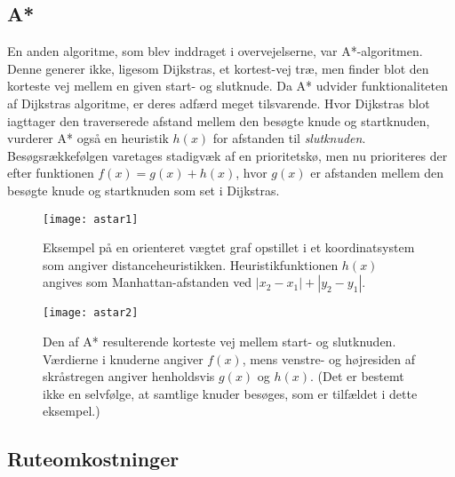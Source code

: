 \subsection{A*}
\label{subsec:astar}
En anden algoritme, som blev inddraget i overvejelserne, var A*-algoritmen. Denne generer ikke, ligesom Dijkstras, et kortest-vej træ, men finder blot den korteste vej mellem en given start- og slutknude. Da A* udvider funktionaliteten af Dijkstras algoritme, er deres adfærd meget tilsvarende. Hvor Dijkstras blot iagttager den traverserede afstand mellem den besøgte knude og startknuden, vurderer A* også en heuristik $h(x)$ for afstanden til \emph{slutknuden}. Besøgsrækkefølgen varetages stadigvæk af en prioritetskø, men nu prioriteres der efter funktionen $f(x)=g(x)+h(x)$, hvor $g(x)$ er afstanden mellem den besøgte knude og startknuden som set i Dijkstras.

\begin{figure}[h]
	\centering
  \texttt{[image: astar1]}
  \captionsetup{width=0.8\textwidth}
	\caption{Eksempel på en orienteret vægtet graf opstillet i et koordinatsystem som angiver distanceheuristikken. Heuristikfunktionen $h(x)$ angives som Manhattan-afstanden ved $|x_2-x_1|+|y_2-y_1|$.}
  \label{fig:astar1}
\end{figure}

\begin{figure}[h]
	\centering
  \texttt{[image: astar2]}
  \captionsetup{width=0.8\textwidth}
	\caption{Den af A* resulterende korteste vej mellem start- og slutknuden. Værdierne i knuderne angiver $f(x)$, mens venstre- og højresiden af skråstregen angiver henholdsvis $g(x)$ og $h(x)$. (Det er bestemt ikke en selvfølge, at samtlige knuder besøges, som er tilfældet i dette eksempel.)}
  \label{fig:astar2}
\end{figure}

\subsection{Ruteomkostninger}
\label{subsec:ruteomkostninger}
